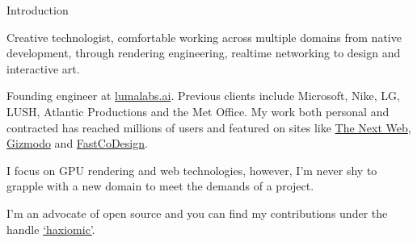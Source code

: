 \documentclass{resume} %
\begin{document}
\begin{rSection}{Introduction}
\item Creative technologist, comfortable working across multiple domains from native development, through rendering engineering, realtime networking to design and interactive art.
\item Founding engineer at \href{https://lumalabs.ai/dream-machine}{lumalabs.ai}. Previous clients include Microsoft, Nike, LG, LUSH, Atlantic Productions and the Met Office. My work both personal and contracted has reached millions of users and featured on sites like \href{http://thenextweb.com/creativity/2015/05/15/webgl-fluid-experiment-is-a-browser-based-lsd-trip/}{The Next Web}, \href{http://www.gizmodo.co.uk/2014/11/just-try-and-stop-playing-with-this-fluid-simulator/}{Gizmodo} and \href{http://www.fastcodesign.com/3038725/this-wonderful-web-toy-turns-your-browser-into-magic-liquid}{FastCoDesign}.

\item I focus on GPU rendering and web technologies, however, I'm never shy to grapple with a new domain to meet the demands of a project. 

\item I'm an advocate of open source and you can find my contributions under the handle \href{http://github.com/haxiomic}{`haxiomic'}.

\end{rSection}

\end{document}
